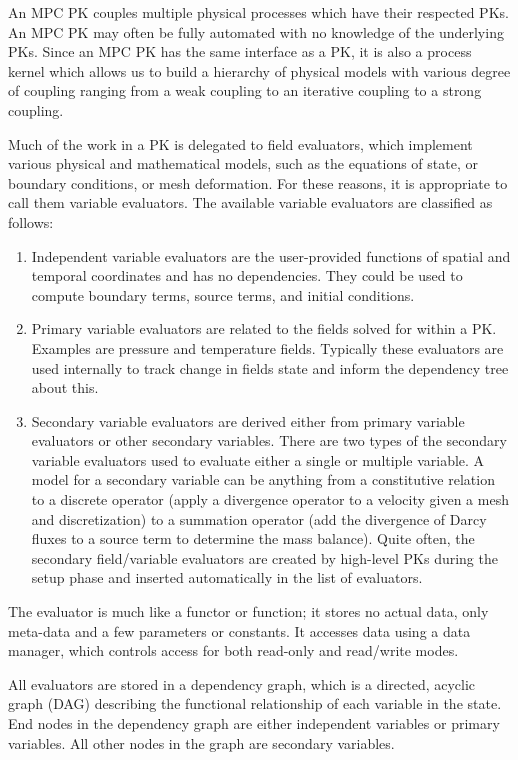 An MPC PK couples multiple physical processes which have their respected PKs.
An MPC PK may often be fully automated with no knowledge of the underlying PKs.
Since an MPC PK has the same interface as a PK, it is also a process kernel which
allows us to build a hierarchy of physical models with various degree of coupling
ranging from a weak coupling to an iterative coupling to a strong coupling.

Much of the work in a PK is delegated to field evaluators, which implement various 
physical and mathematical models, such as the equations of state, or boundary conditions, 
or mesh deformation. 
For these reasons, it is appropriate to call them variable evaluators.
The available variable evaluators are classified as follows:

\begin{enumerate}
\item Independent variable evaluators are the user-provided functions of spatial and temporal coordinates
      and has no dependencies.
      They could be used to compute boundary terms, source terms, and initial conditions. 
\item Primary variable evaluators are related to the fields solved for within a PK.
      Examples are pressure and temperature fields.
      Typically these evaluators are used internally to track change in fields state and inform the 
      dependency tree about this.
\item Secondary variable evaluators are derived either from primary variable evaluators or other secondary variables. 
      There are two types of the secondary variable evaluators used to evaluate either a single or multiple variable.
      A model for a secondary variable can be anything from a constitutive relation to a discrete operator
      (apply a divergence operator to a velocity given a mesh and discretization) 
      to a summation operator (add the divergence of Darcy fluxes to a source term to determine the mass balance).
      Quite often, the secondary field/variable evaluators are created by high-level PKs during the setup phase 
      and inserted automatically in the list of evaluators. 
\end{enumerate}

The evaluator is much like a functor or function; it stores no actual data, only meta-data and 
a few parameters or constants.
It accesses data using a data manager, which controls access for both read-only and read/write modes. 

All evaluators are stored in a dependency graph, which is a directed, acyclic graph (DAG) 
describing the functional relationship of each variable in the state. 
End nodes in the dependency graph are either independent variables or primary variables. 
All other nodes in the graph are secondary variables.

